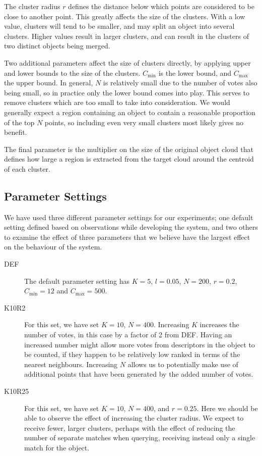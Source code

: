 \documentclass[11pt,a4paper]{kth-mag}
\begin{document}
The cluster radius $r$ defines the distance below which points are considered to
be close to another point. This greatly affects the size of the clusters. With a
low value, clusters will tend to be smaller, and may split an object into
several clusters. Higher values result in larger clusters, and can result in the
clusters of two distinct objects being merged.

Two additional parameters affect the size of clusters directly, by applying
upper and lower bounds to the size of the clusters. $C_{\min}$ is the lower
bound, and $C_{\max}$ the upper bound. In general, $N$ is relatively small due
to the number of votes also being small, so in practice only the lower bound
comes into play. This serves to remove clusters which are too small to take into
consideration. We would generally expect a region containing an object to
contain a reasonable proportion of the top $N$ points, so including even very
small clusters most likely gives no benefit.

The final parameter is the multiplier on the size of the original object cloud
that defines how large a region is extracted from the target cloud around the
centroid of each cluster.

\subsection{Parameter Settings}
We have used three different parameter settings for our experiments; one default
setting defined based on observations while developing the system, and two
others to examine the effect of three parameters that we believe have the
largest effect on the behaviour of the system.
\begin{description}
\item[DEF] The default parameter setting has $K=5$, $l=0.05$, $N=200$, $r=0.2$,
  $C_{\min}=12$ and $C_{\max}=500$.
\item[K10R2] For this set, we have set $K=10$, $N=400$. Increasing $K$ increases
  the number of votes, in this case by a factor of 2 from DEF. Having an
  increased number might allow more votes from descriptors in the object to be
  counted, if they happen to be relatively low ranked in terms of the nearest
  neighbours. Increasing $N$ allows us to potentially make use of additional
  points that have been generated by the added number of votes.
\item[K10R25] For this set, we have set $K=10$, $N=400$, and $r=0.25$. Here we
  should be able to observe the effect of increasing the cluster radius. We
  expect to receive fewer, larger clusters, perhaps with the effect of reducing
  the number of separate matches when querying, receiving instead only a single
  match for the object.
\end{description}
\end{document}
